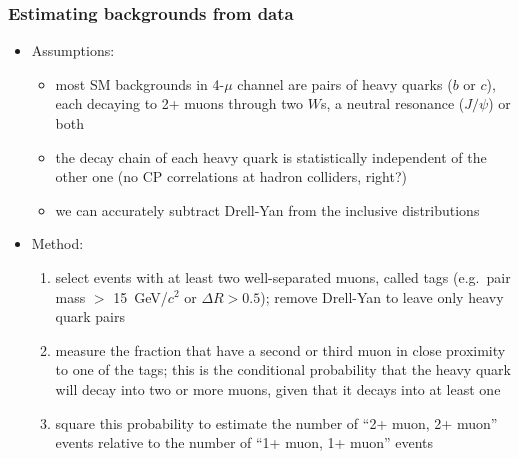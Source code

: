 \documentclass[compress]{beamer}
\begin{document}
\begin{frame}
\frametitle{Estimating backgrounds from data}
\begin{itemize}
\item Assumptions:
\begin{itemize}
\item most SM backgrounds in 4-$\mu$ channel are pairs of heavy quarks
  ($b$ or $c$), each decaying to 2+ muons through two $W$s, a neutral
  resonance ($J/\psi$) or both
\item the decay chain of each heavy quark is statistically independent
  of the other one (no CP correlations at hadron colliders, right?)
\item we can accurately subtract Drell-Yan from the inclusive
  distributions
\end{itemize}

\item Method:
\begin{enumerate}
\item select events with at least two well-separated muons, called
  tags (e.g.\ pair mass $>$ 15~GeV/$c^{2}$ or $\Delta R > 0.5$);
  remove Drell-Yan to leave only heavy quark pairs
\item measure the fraction that have a second or third muon in close
  proximity to one of the tags; this is the conditional probability
  that the heavy quark will decay into two or more muons, given that
  it decays into at least one
\item square this probability to estimate the number of ``2+ muon, 2+
  muon'' events relative to the number of ``1+ muon, 1+ muon'' events
\end{enumerate}
\end{itemize}
\label{numpages}
\end{frame}
\end{document}
